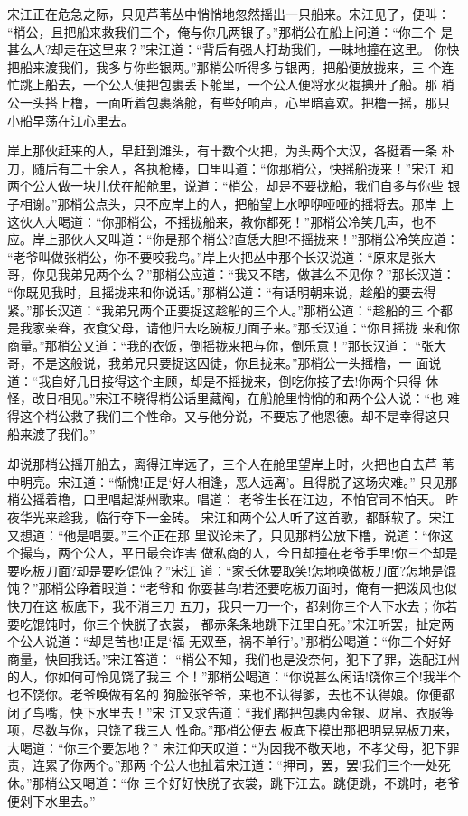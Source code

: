宋江正在危急之际，只见芦苇丛中悄悄地忽然摇出一只船来。宋江见了，便叫：
“梢公，且把船来救我们三个，俺与你几两银子。”那梢公在船上问道：“你三个
是甚么人?却走在这里来？”宋江道：“背后有强人打劫我们，一昧地撞在这里。
你快把船来渡我们，我多与你些银两。”那梢公听得多与银两，把船便放拢来，三
个连忙跳上船去，一个公人便把包裹丢下舱里，一个公人便将水火棍捵开了船。那
梢公一头搭上橹，一面听着包裹落舱，有些好响声，心里暗喜欢。把橹一摇，那只
小船早荡在江心里去。

岸上那伙赶来的人，早赶到滩头，有十数个火把，为头两个大汉，各挺着一条
朴刀，随后有二十余人，各执枪棒，口里叫道：“你那梢公，快摇船拢来！”宋江
和两个公人做一块儿伏在船舱里，说道：“梢公，却是不要拢船，我们自多与你些
银子相谢。”那梢公点头，只不应岸上的人，把船望上水咿咿哑哑的摇将去。那岸
上这伙人大喝道：“你那梢公，不摇拢船来，教你都死！”那梢公冷笑几声，也不
应。岸上那伙人又叫道：“你是那个梢公?直恁大胆!不摇拢来！”那梢公冷笑应道：
“老爷叫做张梢公，你不要咬我鸟。”岸上火把丛中那个长汉说道：“原来是张大
哥，你见我弟兄两个么？”那梢公应道：“我又不瞎，做甚么不见你？”那长汉道：
“你既见我时，且摇拢来和你说话。”那梢公道：“有话明朝来说，趁船的要去得
紧。”那长汉道：“我弟兄两个正要捉这趁船的三个人。”那梢公道：“趁船的三
个都是我家亲眷，衣食父母，请他归去吃碗板刀面子来。”那长汉道：“你且摇拢
来和你商量。”那梢公又道：“我的衣饭，倒摇拢来把与你，倒乐意！”那长汉道：
“张大哥，不是这般说，我弟兄只要捉这囚徒，你且拢来。”那梢公一头摇橹，一
面说道：“我自好几日接得这个主顾，却是不摇拢来，倒吃你接了去!你两个只得
休怪，改日相见。”宋江不晓得梢公话里藏阄，在船舱里悄悄的和两个公人说：“也
难得这个梢公救了我们三个性命。又与他分说，不要忘了他恩德。却不是幸得这只
船来渡了我们。”

却说那梢公摇开船去，离得江岸远了，三个人在舱里望岸上时，火把也自去芦
苇中明亮。宋江道：“惭愧!正是‘好人相逢，恶人远离’。且得脱了这场灾难。”
只见那梢公摇着橹，口里唱起湖州歌来。唱道：
老爷生长在江边，不怕官司不怕天。
昨夜华光来趁我，临行夺下一金砖。
宋江和两个公人听了这首歌，都酥软了。宋江又想道：“他是唱耍。”三个正在那
里议论未了，只见那梢公放下橹，说道：“你这个撮鸟，两个公人，平日最会诈害
做私商的人，今日却撞在老爷手里!你三个却是要吃板刀面?却是要吃馄饨？”宋江
道：“家长休要取笑!怎地唤做板刀面?怎地是馄饨？”那梢公睁着眼道：“老爷和
你耍甚鸟!若还要吃板刀面时，俺有一把泼风也似快刀在这板底下，我不消三刀
五刀，我只一刀一个，都剁你三个人下水去；你若要吃馄饨时，你三个快脱了衣裳，
都赤条条地跳下江里自死。”宋江听罢，扯定两个公人说道：“却是苦也!正是‘福
无双至，祸不单行’。”那梢公喝道：“你三个好好商量，快回我话。”宋江答道：
“梢公不知，我们也是没奈何，犯下了罪，迭配江州的人，你如何可怜见饶了我三
个！”那梢公喝道：“你说甚么闲话!饶你三个!我半个也不饶你。老爷唤做有名的
狗脸张爷爷，来也不认得爹，去也不认得娘。你便都闭了鸟嘴，快下水里去！”宋
江又求告道：“我们都把包裹内金银、财帛、衣服等项，尽数与你，只饶了我三人
性命。”那梢公便去板底下摸出那把明晃晃板刀来，大喝道：“你三个要怎地？”
宋江仰天叹道：“为因我不敬天地，不孝父母，犯下罪责，连累了你两个。”那两
个公人也扯着宋江道：“押司，罢，罢!我们三个一处死休。”那梢公又喝道：“你
三个好好快脱了衣裳，跳下江去。跳便跳，不跳时，老爷便剁下水里去。”

